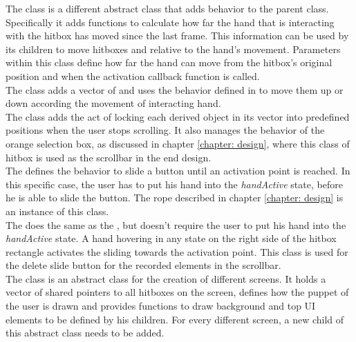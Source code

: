 The  class is a different abstract class that adds behavior to the parent class. Specifically it adds functions to calculate how far the hand that is interacting with the hitbox has moved since the last frame. This information can be used by its children to move hitboxes and  relative to the hand's movement. Parameters within this class define how far the hand can move from the hitbox's original position and when the activation callback function is called.\\

The  class adds a vector of  and uses the behavior defined in  to move them up or down according the movement of interacting hand.\\

The  class adds the act of locking each  derived object in its vector into predefined positions when the user stops scrolling. It also manages the behavior of the orange selection box, as discussed in chapter \ref{chapter: design}, where this class of hitbox is used as the scrollbar in the end design.\\

The  defines the behavior to slide a button until an activation point is reached. In this specific case, the user has to put his hand into the \emph{handActive} state, before he is able to slide the button. The rope described in chapter \ref{chapter: design} is an instance of this class.\\

The  does the same as the , but doesn't require the user to put his hand into the \emph{handActive} state. A hand hovering in any state on the right side of the hitbox rectangle activates the sliding towards the activation point. This class is used for the delete slide button for the recorded elements in the scrollbar.\\

The  class is an abstract class for the creation of different screens. It holds a vector of shared pointers to all hitboxes on the screen, defines how the puppet of the user is drawn and provides functions to draw background and top UI elements to be defined by his children. For every different screen, a new child of this abstract class needs to be added.\\

